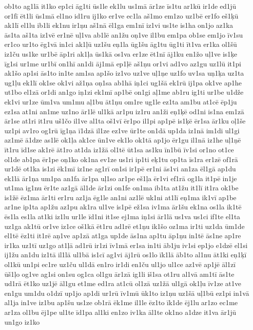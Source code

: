 {ob1to
ag1lā
it1ko
ep1ci
āg1ti
ūs1le
ek1lu
us1mā
ār1ze
īs1tu
ar1kū
ir1de
ed1jū
or1fī
ēt1li
ūs1mā
el1no
id1ru
ij1ko
er1ve
ec1la
aš1mo
em1zo
uz1bē
er1fo
eš1ķū
ak1lī
el1lu
ib1li
ek1nu
ir1ņu
aš1nā
ēl1ga
em1nī
iz1vi
us1te
is1ha
on1jo
az1ka
ās1ta
aš1ta
iz1vē
er1nē
uļ1va
ab1lē
an1žu
oņ1ve
il1bu
em1pa
ob1se
em1jo
īv1su
er1co
ur1to
ēg1vā
in1ci
ak1ļū
uz1šu
eņ1la
ūg1šu
āg1tu
ūg1ti
īt1va
er1ka
ol1šū
iz1ču
us1ke
ur1bē
āp1ri
ak1ļa
ūs1kā
os1va
er1ze
ēt1nī
āj1ku
en1žo
uļ1ve
is1ķe
īg1si
ur1me
ur1bī
on1hī
an1di
āj1mā
ep1ļē
aš1ņu
or1vi
ad1vo
az1gu
uz1lū
it1pi
ak1šo
ap1si
ās1to
in1te
am1sa
ap1šo
iz1vo
uz1ve
uļ1ņe
uz1fo
uv1sa
uņ1ķa
uz1ta
ug1ļu
ek1lī
ok1se
ok1vi
až1ņa
oņ1sa
ab1hā
iņ1ci
ug1šā
ek1rū
ij1pa
ok1ve
ap1he
ut1bo
el1zā
or1di
an1go
iņ1zi
ek1mī
ap1bē
on1gi
aļ1me
ab1ru
ig1ti
ur1be
u1dže
ek1vi
ur1ze
ūm1va
um1mu
aļ1bu
āt1ņu
om1re
ug1le
ez1ta
am1bu
at1cē
ēp1ju
ez1sa
at1ni
an1me
uz1no
ār1lē
ul1kā
ar1pu
iz1ru
an1ži
eņ1ķē
od1ni
is1na
em1zā
ār1se
at1ri
it1ru
uš1čo
il1ve
al1ta
oš1vī
ēr1po
il1pi
ap1pē
is1ķē
ēr1sa
ār1ku
oļ1še
uz1pi
av1ro
og1rū
īg1ņa
ī1dzā
il1ze
ez1ve
ūr1te
on1dā
up1da
iz1nā
im1di
ul1gi
az1mē
ā1dze
as1lē
ok1ļa
ak1ce
ūn1ve
ek1lo
ok1tā
ap1jo
ēr1gu
il1nā
iz1he
uļ1ņē
īt1ru
īd1se
ak1rē
āt1ro
at1da
iz1žā
ol1tē
ūt1sa
as1ku
īn1bū
īv1si
or1no
ot1ce
ol1de
ab1pa
ēr1pe
oņ1ko
ok1na
ev1ze
us1ri
ip1ti
eķ1tu
op1ta
īs1ra
er1zē
of1rā
ur1dē
ot1ka
is1zi
ēk1mī
iz1ne
ag1rī
on1si
ir1pē
er1ni
ās1vi
an1za
ēl1gā
ap1du
ek1lā
ār1ņa
um1pa
an1fa
ār1pa
uļ1so
ar1pe
eš1ļa
ēr1vi
ef1rā
og1la
it1pē
in1je
ut1ma
ig1nu
ēr1te
az1gā
āl1de
ār1zi
on1fe
on1ma
ib1ta
at1žu
it1lī
it1ra
ok1be
is1žē
ēz1ma
ār1ti
er1ru
az1ja
ēg1le
an1ni
az1lē
uk1ni
at1lī
eņ1ma
ik1vī
ap1be
ar1ne
ip1ta
ap1žu
az1pu
ak1ra
ul1ve
is1pē
ež1sa
iv1ma
ār1šu
ek1na
os1la
ik1tē
ēs1la
es1la
at1ki
iz1lu
ur1le
īd1ni
it1se
ej1ma
iņ1si
ār1lā
us1va
us1ci
if1te
el1ta
uz1ga
ak1tū
or1ve
iz1ce
oš1kā
ēt1ru
ad1rē
et1ņu
ik1šo
oz1ma
ir1ti
uz1da
ūm1de
el1tē
ēz1ti
it1rē
aņ1ve
ap1zā
at1ga
up1de
ās1na
ap1tu
āp1ņu
in1tē
ās1ne
ap1re
ir1ka
uz1tī
uz1go
at1ļā
ad1rū
ir1zi
īv1mā
er1sa
in1ti
āb1ju
iv1si
ep1jo
e1dzē
el1si
ij1žu
an1du
iz1tā
il1lā
ul1bā
is1cī
ag1vi
āj1rū
os1lo
īk1lā
āb1to
al1nu
āt1ki
eņ1ķī
ol1kū
un1pi
ec1re
uz1ču
ul1dā
en1ro
ir1di
en1ču
ul1jo
ul1ce
az1vē
ap1jē
āl1zī
ūš1ļo
og1ve
ag1si
on1su
og1ca
ol1gu
ār1zā
ig1li
iš1sa
ot1ru
al1vā
am1tī
ās1te
ud1rā
ēt1ko
uz1jē
āl1gu
et1me
ed1ra
at1cū
ol1zā
uz1žā
ul1gā
ok1ļu
īv1ze
at1ve
en1gu
um1du
o1dzī
up1jo
ap1di
ur1rū
īv1mū
ūk1to
iz1ņu
uz1šā
uļ1bū
ez1pi
in1vā
al1ja
in1ve
iz1bu
ap1šu
us1ze
ob1rā
ēk1me
il1le
ēz1to
īk1de
ēj1lu
ar1zo
ec1me
ar1za
ol1bu
ēj1pe
ul1te
īd1pa
al1ki
en1zo
iv1ka
āl1te
ok1no
a1dze
it1va
ār1jū
un1go
iz1ko
}
